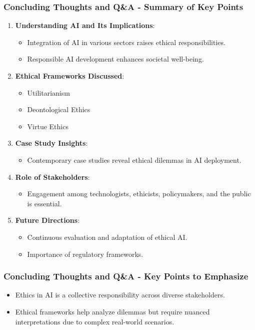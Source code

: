 \documentclass[aspectratio=169]{beamer}
\begin{document}
\begin{frame}[fragile]
    \frametitle{Concluding Thoughts and Q\&A - Summary of Key Points}
    \begin{enumerate}
        \item \textbf{Understanding AI and Its Implications}:
        \begin{itemize}
            \item Integration of AI in various sectors raises ethical responsibilities.
            \item Responsible AI development enhances societal well-being.
        \end{itemize}
        
        \item \textbf{Ethical Frameworks Discussed}:
        \begin{itemize}
            \item Utilitarianism
            \item Deontological Ethics
            \item Virtue Ethics
        \end{itemize}
        
        \item \textbf{Case Study Insights}:
        \begin{itemize}
            \item Contemporary case studies reveal ethical dilemmas in AI deployment.
        \end{itemize}

        \item \textbf{Role of Stakeholders}:
        \begin{itemize}
            \item Engagement among technologists, ethicists, policymakers, and the public is essential.
        \end{itemize}

        \item \textbf{Future Directions}:
        \begin{itemize}
            \item Continuous evaluation and adaptation of ethical AI.
            \item Importance of regulatory frameworks.
        \end{itemize}
    \end{enumerate}
\end{frame}

\begin{frame}[fragile]
    \frametitle{Concluding Thoughts and Q\&A - Key Points to Emphasize}
    \begin{itemize}
        \item Ethics in AI is a collective responsibility across diverse stakeholders.
        \item Ethical frameworks help analyze dilemmas but require nuanced interpretations due to complex real-world scenarios.
    \end{itemize}
\end{frame}
\end{document}
